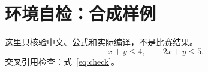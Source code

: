 \documentclass[UTF8,fontset=fandol]{ctexart}
\begin{document}
\section*{环境自检：合成样例}
这里只核验中文、公式和实际编译，不是比赛结果。
\begin{equation}\label{eq:check}x+y\leq 4,\qquad 2x+y\leq 5.\end{equation}
交叉引用检查：式~\eqref{eq:check}。
\end{document}
